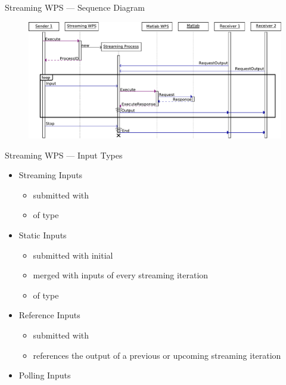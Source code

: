 \documentclass[xcolor=svgnames,professionalfonts,11pt,aspectratio=43]{beamer}
\begin{document}
\begin{frame}[c,fragile]{Streaming WPS --- Sequence Diagram}
  \begin{figure}
    \begin{center}
      \includegraphics[width=\textwidth]{figures/sequence-diagram2.pdf}
    \end{center}
  \end{figure}
\end{frame}

\begin{frame}{Streaming WPS --- Input Types}
  \begin{itemize}
    \item Streaming Inputs
    \pause
    \begin{itemize}
      \item submitted with 
      \item of type 
    \end{itemize}
    \pause
    \item Static Inputs
    \pause
    \begin{itemize}
      \item submitted with initial 
      \item merged with inputs of every streaming iteration
      \item of type 
    \end{itemize}
    \pause
    \item Reference Inputs
    \pause
    \begin{itemize}
      \item submitted with 
      \item references the output of a previous or upcoming streaming iteration
    \end{itemize}
    \pause
    \item Polling Inputs
  \end{itemize}
\end{frame}
\end{document}
